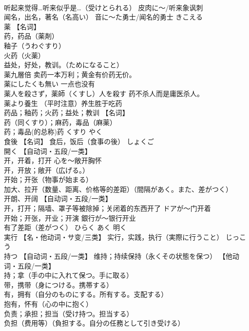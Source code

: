 \documentclass[8pt]{extreport}
\begin{document}
\begin{CJK}{UTF8}{min}
\\	听起来觉得…听来似乎是…（受けとられる） 皮肉に〜/听来象讽刺 
\\	闻名，出名，著名（名高い） 音に〜た勇士/闻名的勇士	きこえる	
\\	薬	【名词】 
\\	药，药品（薬剤） 
\\	釉子（うわぐすり） 
\\	火药（火薬） 
\\	益处，好处，教训。（ためになること） 
\\	薬九層倍 卖药一本万利；黄金有价药无价。 
\\	薬にしたくも無い 一点也没有 
\\	薬人を殺さず，薬師（くすし）人を殺す 药不杀人而是庸医杀人。 
\\	薬より養生 （平时注意）养生胜于吃药 
\\	药品；釉药；火药；益处；教训 【名词】 
\\	药（同くすり）；麻药，毒品（麻薬） 
\\	药；毒品(的总称)药	くすり やく	
\\	食後	【名词】 食后，饭后（食事の後）	しょくご	
\\	開く	【自动词・五段/一类】 
\\	开，开着，打开 心を～敞开胸怀 
\\	开，开放；敞开（広げる。） 
\\	开始；开张（物事が始まる） 
\\	加大、拉开（数量、距离、价格等的差距）（間隔があく。また、差がつく） 
\\	开朗、开阔 【自动词・五段/一类】 
\\	开，打开；隔墙、罩子等被除掉；关闭着的东西开了 ドアが～门开着 
\\	开始；开张，开业；开演 銀行が～银行开业 
\\	有了差距（差がつく）	ひらく あく	明く
\\	実行	【名・他动词・サ变/三类】 实行，实践，执行（実際に行うこと）	じっこう	
\\	持つ	【自动词・五段/一类】 维持；持续保持（永くその状態を保つ） 【他动词・五段/一类】 
\\	持；拿（手の中に入れて保つ。手に取る） 
\\	带，携带（身につける。携帯する） 
\\	有，拥有（自分のものにする。所有する。支配する） 
\\	抱有，怀有（心の中に抱く） 
\\	负责；承担；担当（受け持つ。担当する） 
\\	负担（费用等）（負担する。自分の任務として引き受ける） 

\end{CJK}
\end{document}
